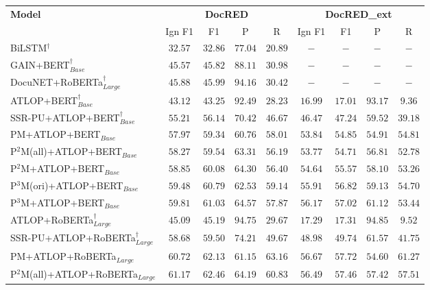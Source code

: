 \documentclass[letterpaper]{article} %
\begin{document}
\begin{table}[!ht]
\centering
\begin{tabular}{lcccc|cccc}
\toprule
\multirow{2}{*}{\textbf{Model}} & \multicolumn{4}{c}{\textbf{DocRED}} & \multicolumn{4}{c}{\textbf{DocRED\_ext}} \\
\cmidrule(l){2-9} & Ign F1 & F1 & P & R & Ign F1 & F1 & P & R \\ \midrule
BiLSTM$^{\dagger}$ & $32.57$ & $32.86$ & $77.04$ & $20.89$ & $-$ & $-$ & $-$ & $-$ \\
GAIN+BERT$_{Base}^{\dagger}$ & $45.57$ & $45.82$ & $88.11$ & $30.98$ & $-$ & $-$ & $-$ & $-$ \\
DocuNET+RoBERTa$_{Large}^{\dagger}$ & $45.88$ & $45.99$ & $94.16$ & $30.42$ & $-$ & $-$ & $-$ & $-$ \\
\midrule
ATLOP+BERT$_{Base}^{\dagger}$ & $43.12$ & $43.25$ & $\mathbf{92.49}$ & $28.23$ & $16.99$ & $17.01$ & $\mathbf{93.17}$ & $9.36$ \\
SSR-PU+ATLOP+BERT$_{Base}^{\dagger}$ & $55.21$ & $56.14$ & $70.42$ & $46.67$ & $46.47$ & $47.24$ & $59.52$ & $39.18$ \\
PM+ATLOP+BERT$_{Base}$ & $57.97$ & $59.34$ & $60.76$ & $58.01$ & $53.84$ & $54.85$ & $54.91$ & $\mathbf{54.81}$ \\
P$^{2}$M(all)+ATLOP+BERT$_{Base}$ & $58.27$ & $59.54$ & $63.31$ & $56.19$ & $53.77$ & $54.71$ & $56.81$ & $52.78$ \\
P$^{2}$M+ATLOP+BERT$_{Base}$ & $58.85$ & $60.08$ & $64.30$ & $56.40$ & $54.64$ & $55.57$ & $58.10$ & $53.26$ \\
P$^{3}$M(ori)+ATLOP+BERT$_{Base}$ & $59.48$ & $60.79$ & $62.53$ & $\mathbf{59.14}$ & $55.91$ & $56.82$ & $59.13$ & $54.70$ \\
P$^{3}$M+ATLOP+BERT$_{Base}$ & $\mathbf{59.81}$ & $\mathbf{61.03}$ & $64.57$ & $57.87$ & $\mathbf{56.17}$ & $\mathbf{57.02}$ & $61.12$ & $53.44$ \\
\midrule
ATLOP+RoBERTa$_{Large}^{\dagger}$ & $45.09$ & $45.19$ & $\mathbf{94.75}$ & $29.67$ & $17.29$ & $17.31$ & $\mathbf{94.85}$ & $9.52$ \\
SSR-PU+ATLOP+RoBERTa$_{Large}^{\dagger}$ & $58.68$ & $59.50$ & $74.21$ & $49.67$ & $48.98$ & $49.74$ & $61.57$ & $41.75$ \\
PM+ATLOP+RoBERTa$_{Large}$ & $60.72$ & $62.13$ & $61.15$ & $63.16$ & $56.67$ & $57.72$ & $54.60$ & $\mathbf{61.27}$ \\
P$^{2}$M(all)+ATLOP+RoBERTa$_{Large}$ & $61.17$ & $62.46$ & $64.19$ & $60.83$ & $56.49$ & $57.46$ & $57.42$ & $57.51$ \\

\end{tabular}
\end{table}
\end{document}
